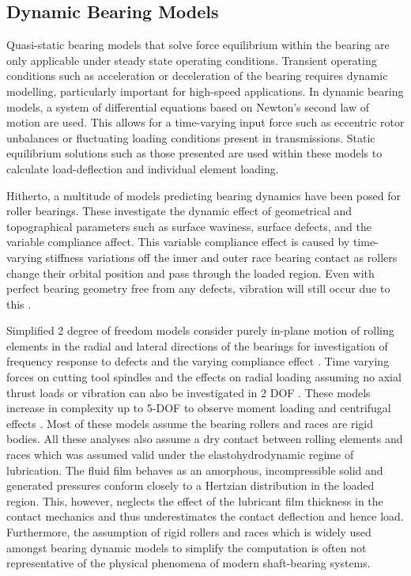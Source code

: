 \subsection{Dynamic Bearing Models}

Quasi-static bearing models that solve force equilibrium within the bearing are only applicable under steady state operating conditions. Transient operating conditions such as acceleration or deceleration of the bearing requires dynamic modelling, particularly important for high-speed applications. In dynamic bearing models, a system of differential equations based on Newton’s second law of motion are used. This allows for a time-varying input force such as eccentric rotor unbalances or fluctuating loading conditions present in transmissions. Static equilibrium solutions such as those presented are used within these models to calculate load-deflection and individual element loading. 

Hitherto, a multitude of models predicting bearing dynamics have been posed for roller bearings. These investigate the dynamic effect of geometrical and topographical parameters such as surface waviness, surface defects, and the variable compliance affect. This variable compliance effect is caused by time-varying stiffness variations off the inner and outer race bearing contact as rollers change their orbital position and pass through the loaded region. Even with perfect bearing geometry free from any defects, vibration will still occur due to this \cite{Sopanen2003_1}.
  
Simplified 2 degree of freedom models \cite{Walters1971} consider purely in-plane motion of rolling elements in the radial and lateral directions of the bearings for investigation of frequency response to defects \cite{Meyer1980} and the varying compliance effect \cite{Sunnersjo1978}.  Time varying forces on cutting tool spindles and the effects on radial loading assuming no axial thrust loads or vibration can also be investigated in 2 DOF \cite{Matsubara1988}. These models increase in complexity up to 5-DOF  to observe moment loading and centrifugal effects \cite{Rahnejat2004} \cite{Gupta1979}. Most of these models assume the bearing rollers and races are rigid bodies. All these analyses also assume a dry contact between rolling elements and races which was assumed valid under the elastohydrodynamic regime of lubrication. The fluid film behaves as an amorphous, incompressible solid and generated pressures conform closely to a Hertzian distribution in the loaded region. This, however, neglects the effect of the lubricant film thickness in the contact mechanics and thus underestimates the contact deflection and hence load. Furthermore, the assumption of rigid rollers and races which is widely used amongst bearing dynamic models to simplify the computation is often not representative of the physical phenomena of modern shaft-bearing systems.

